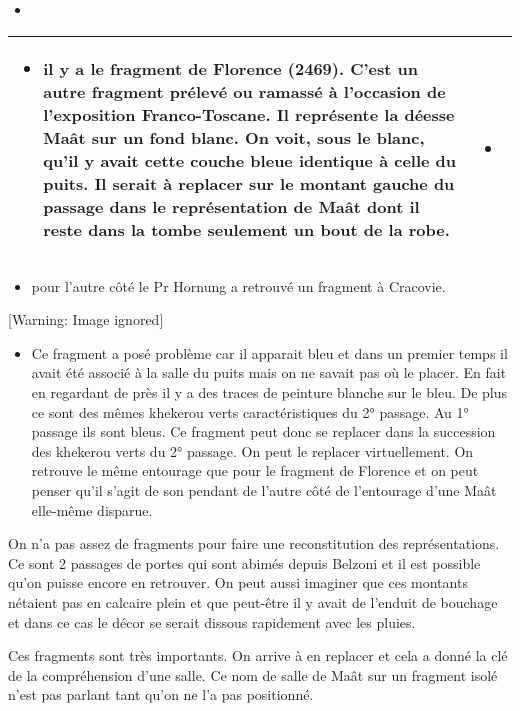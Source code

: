 \documentclass{article}
\begin{document}
\begin{itemize}
\item \end{itemize}
\begin{flushleft}
\tablehead{}
\begin{supertabular}{|m{8.873cm}|m{8.91cm}|}
\hline
\begin{itemize}
\item il y a le fragment de Florence (2469). C’est un autre fragment
prélevé ou ramassé à l’occasion de l’exposition Franco-Toscane. Il
représente la déesse Maât sur un fond blanc. On voit, sous le blanc,
qu’il y avait cette couche bleue identique à celle du puits. Il serait
à replacer sur le montant gauche du passage dans le représentation de
Maât dont il reste dans la tombe seulement un bout de la
robe.\end{itemize}
 &
\begin{itemize}
\item   [Warning: Image ignored] %
 \end{itemize}
\\\hline
\end{supertabular}
\end{flushleft}
\begin{itemize}
\item pour l’autre côté le Pr Hornung a retrouvé un fragment à Cracovie.

\end{itemize}
  [Warning: Image ignored] %
 

\begin{itemize}
\item Ce fragment a posé problème car il apparait bleu et dans un
premier temps il avait été associé à la salle du puits mais on ne
savait pas où le placer. En fait en regardant de près il y a des traces
de peinture blanche sur le bleu. De plus ce sont des mêmes khekerou
verts caractéristiques du 2° passage. Au 1° passage ils sont bleus. Ce
fragment peut donc se replacer dans la succession des khekerou verts du
2° passage. On peut le replacer virtuellement. On retrouve le même
entourage que pour le fragment de Florence et on peut penser qu’il
s’agit de son pendant de l’autre côté de l’entourage d’une Maât
elle-même disparue. 
\end{itemize}
On n’a pas assez de fragments pour faire une reconstitution des
représentations. Ce sont 2 passages de portes qui sont abimés depuis
Belzoni et il est possible qu’on puisse encore en retrouver. On peut
aussi imaginer que ces montants n{\textquotesingle}étaient pas en
calcaire plein et que peut-être il y avait de l’enduit de bouchage et
dans ce cas le décor se serait dissous rapidement avec les pluies.

Ces fragments sont très importants. On arrive à en replacer et cela a
donné la clé de la compréhension d’une salle. Ce nom de salle de Maât
sur un fragment isolé n’est pas parlant tant qu’on ne l’a pas
positionné.
\end{document}

